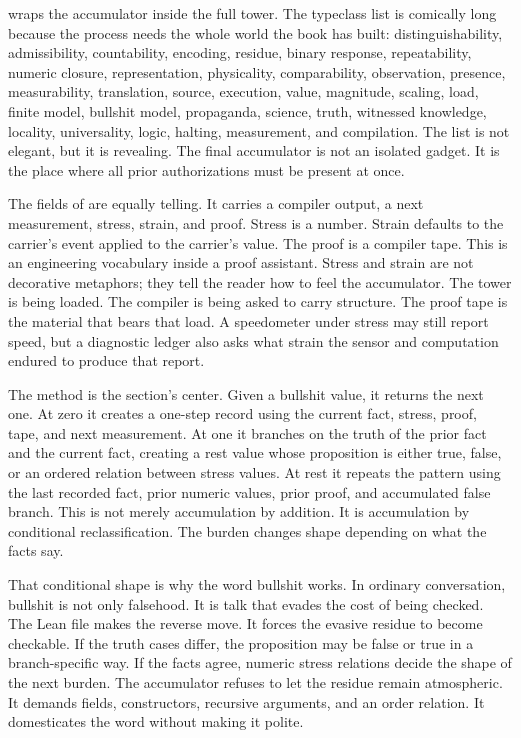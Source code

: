  wraps the accumulator inside the full tower. The typeclass
list is comically long because the process needs the whole world the book has
built: distinguishability, admissibility, countability, encoding, residue,
binary response, repeatability, numeric closure, representation, physicality,
comparability, observation, presence, measurability, translation, source,
execution, value, magnitude, scaling, load, finite model, bullshit model,
propaganda, science, truth, witnessed knowledge, locality, universality,
logic, halting, measurement, and compilation. The list is not elegant, but it
is revealing. The final accumulator is not an isolated gadget. It is the place
where all prior authorizations must be present at once.

The fields of  are equally telling. It carries a compiler
output, a next measurement, stress, strain, and proof. Stress is a number.
Strain defaults to the carrier's event applied to the carrier's value. The
proof is a compiler tape. This is an engineering vocabulary inside a proof
assistant. Stress and strain are not decorative metaphors; they tell the
reader how to feel the accumulator. The tower is being loaded. The compiler
is being asked to carry structure. The proof tape is the material that bears
that load. A speedometer under stress may still report speed, but a diagnostic
ledger also asks what strain the sensor and computation endured to produce
that report.

The method  is the section's center. Given a bullshit value, it
returns the next one. At zero it creates a one-step record using the current
fact, stress, proof, tape, and next measurement. At one it branches on the
truth of the prior fact and the current fact, creating a rest value whose
proposition is either true, false, or an ordered relation between stress
values. At rest it repeats the pattern using the last recorded fact, prior
numeric values, prior proof, and accumulated false branch. This is not merely
accumulation by addition. It is accumulation by conditional reclassification.
The burden changes shape depending on what the facts say.

That conditional shape is why the word bullshit works. In ordinary
conversation, bullshit is not only falsehood. It is talk that evades the cost
of being checked. The Lean file makes the reverse move. It forces the evasive
residue to become checkable. If the truth cases differ, the proposition may be
false or true in a branch-specific way. If the facts agree, numeric stress
relations decide the shape of the next burden. The accumulator refuses to let
the residue remain atmospheric. It demands fields, constructors, recursive
arguments, and an order relation. It domesticates the word without making it
polite.

